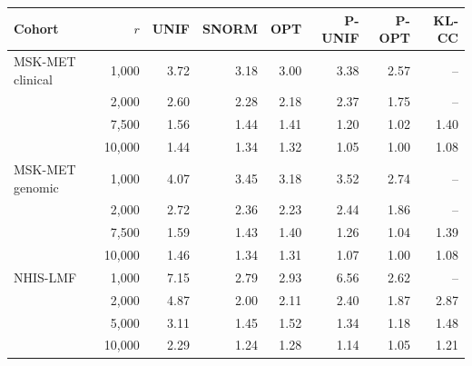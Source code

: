 \begin{tabular}{lrrrrrrr}
\toprule
Cohort & \(r\) & UNIF & SNORM & OPT & P-UNIF & P-OPT & KL-CC\\
\midrule
MSK-MET clinical & 1,000 & 3.72 & 3.18 & 3.00 & 3.38 & 2.57 & --\\
 & 2,000 & 2.60 & 2.28 & 2.18 & 2.37 & 1.75 & --\\
 & 7,500 & 1.56 & 1.44 & 1.41 & 1.20 & 1.02 & 1.40\\
 & 10,000 & 1.44 & 1.34 & 1.32 & 1.05 & 1.00 & 1.08\\
\addlinespace
MSK-MET genomic & 1,000 & 4.07 & 3.45 & 3.18 & 3.52 & 2.74 & --\\
 & 2,000 & 2.72 & 2.36 & 2.23 & 2.44 & 1.86 & --\\
 & 7,500 & 1.59 & 1.43 & 1.40 & 1.26 & 1.04 & 1.39\\
 & 10,000 & 1.46 & 1.34 & 1.31 & 1.07 & 1.00 & 1.08\\
\addlinespace
NHIS-LMF & 1,000 & 7.15 & 2.79 & 2.93 & 6.56 & 2.62 & --\\
 & 2,000 & 4.87 & 2.00 & 2.11 & 2.40 & 1.87 & 2.87\\
 & 5,000 & 3.11 & 1.45 & 1.52 & 1.34 & 1.18 & 1.48\\
 & 10,000 & 2.29 & 1.24 & 1.28 & 1.14 & 1.05 & 1.21\\
\bottomrule
\end{tabular}
